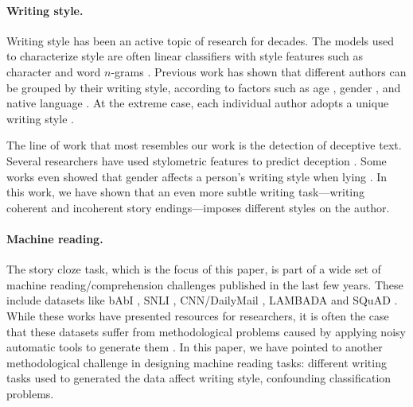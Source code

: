 \documentclass[11pt,a4paper]{article}
\newcommand{\com}[1]{}
\newcommand{\resolved}[1]{}
\newcommand{\nascomment}[1]{{\color{blue}\textsc{[#1 --nas]}}}
\renewcommand{\nascomment}[1]{}
\begin{document}
\paragraph{Writing style.}
Writing style has been an active topic of research for decades. 
The models used to characterize style are often linear classifiers with style features such as character and word $n$-grams \cite{Stamatatos:2009,Koppel:2009}.
Previous work has shown that different authors can be grouped by their
writing style, according to factors such as age
\cite{Pennebaker:2003,Argamon:2003,Schler:2006,Rosenthal:2011,nguyen:2011:latech},
gender \cite{Argamon:2003,Schler:2006,bamman2014gender}, and native language
\cite{Koppel:2005,Tsur:2007,Bergsma:2012}.
At the extreme case, each individual author adopts a unique writing
style \cite{mosteller1963inference,pennebaker1999linguistic,Schwartz:2013}. 
\com{Interestingly, previous work has shown that individual style can be affected from coarse-grained factors such as those just described, but also from other less apparent factors such as mental state, or even living in a high-elevation location \cite{schwartz2013personality}.

Unlike the works just described which compare the writing style
between different authors, some works have shown that the same author
can adopt a different style used when writing positive vs.~negative
text \cite{Davidov:2010} or when writing sarcastic text \cite{Tsur:2010}. In this work, we have shown that the same author can adopt a different style when facing different writing tasks.}

The line of work that most resembles our work is the detection of deceptive text. 
Several researchers have used stylometric features to  predict deception 
\cite{Newman:2003,hancock2007lying,ott2011finding,Feng:2012}.
Some works even showed that gender affects a person's  writing style when lying \cite{Perez:2014b,Perez:2014a}.
In this work, we have shown that an even more subtle writing task---writing {coherent} and {incoherent} story endings---imposes different styles on the author.


\paragraph{Machine reading.}
The  story cloze task, which is the focus of this paper, is part of a wide set of machine reading/comprehension challenges published in the last few years.
These include datasets like bAbI \cite{Weston:2015}, SNLI \cite{bowman2015large}, CNN/DailyMail \cite{hermann2015teaching}, LAMBADA \cite{Paperno:2016} and SQuAD \cite{rajpurkar2016squad}. 
While these works have presented resources for researchers, 
it is often the case that these datasets suffer from methodological
problems caused by applying noisy automatic tools to generate them \cite{Chen:2016}. 
In this paper, we have pointed to another methodological challenge in
designing machine reading tasks:  different writing tasks
used to generated the data affect writing style, confounding classification problems.
 \resolved{\nascomment{dropped the train/test discrepancy here}}
\end{document}
